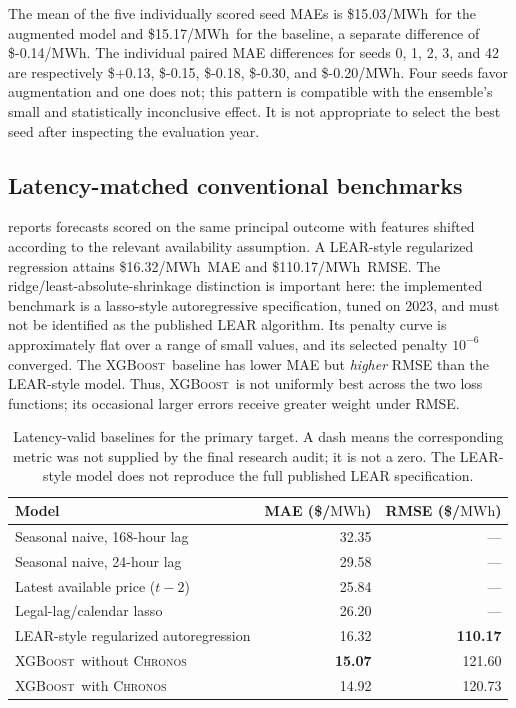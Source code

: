 \documentclass[11pt,letterpaper]{article}
\newcommand{\MWh}{\ensuremath{\mathrm{MWh}}}
\newcommand{\Chronos}{\textsc{Chronos}}
\newcommand{\XGB}{\textsc{XGBoost}}
\begin{document}
The mean of the five individually scored seed MAEs is \$15.03/\MWh\ for the augmented model and \$15.17/\MWh\ for the baseline, a separate difference of \$-0.14/\MWh. The individual paired MAE differences for seeds 0, 1, 2, 3, and 42 are respectively \$+0.13, \$-0.15, \$-0.18, \$-0.30, and \$-0.20/\MWh. Four seeds favor augmentation and one does not; this pattern is compatible with the ensemble's small and statistically inconclusive effect. It is not appropriate to select the best seed after inspecting the evaluation year.

\subsection{Latency-matched conventional benchmarks}
 reports forecasts scored on the same principal outcome with features shifted according to the relevant availability assumption. A LEAR-style regularized regression attains \$16.32/\MWh\ MAE and \$110.17/\MWh\ RMSE. The ridge/least-absolute-shrinkage distinction is important here: the implemented benchmark is a lasso-style autoregressive specification, tuned on 2023, and must not be identified as the published LEAR algorithm. Its penalty curve is approximately flat over a range of small values, and its selected penalty $10^{-6}$ converged. The \XGB\ baseline has lower MAE but \emph{higher} RMSE than the LEAR-style model. Thus, \XGB\ is not uniformly best across the two loss functions; its occasional larger errors receive greater weight under RMSE.

\begin{table}[t]
\centering\small
\caption{Latency-valid baselines for the primary target. A dash means the corresponding metric was not supplied by the final research audit; it is not a zero. The LEAR-style model does not reproduce the full published LEAR specification.}\label{tab:baselines}
\begin{tabular}{@{}lrr@{}}
\toprule
Model & MAE (\$/\MWh) & RMSE (\$/\MWh)\\
\midrule
Seasonal naive, 168-hour lag & 32.35 & ---\\
Seasonal naive, 24-hour lag & 29.58 & ---\\
Latest available price ($t-2$) & 25.84 & ---\\
Legal-lag/calendar lasso & 26.20 & ---\\
LEAR-style regularized autoregression & 16.32 & \textbf{110.17}\\
\XGB\ without \Chronos & \textbf{15.07} & 121.60\\
\XGB\ with \Chronos & 14.92 & 120.73\\
\bottomrule
\end{tabular}
\end{table}
\end{document}
